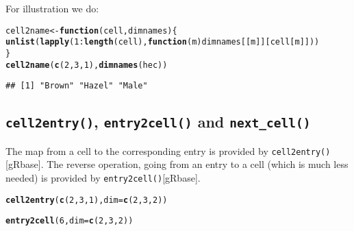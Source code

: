 \documentclass[10pt]{article}\usepackage[]{graphicx}\usepackage[]{xcolor}
\makeatletter
\newcommand{\hlnum}[1]{\textcolor[rgb]{0.686,0.059,0.569}{#1}}%
\newcommand{\hlopt}[1]{\textcolor[rgb]{0,0,0}{#1}}%
\newcommand{\hlstd}[1]{\textcolor[rgb]{0.345,0.345,0.345}{#1}}%
\newcommand{\hlkwa}[1]{\textcolor[rgb]{0.161,0.373,0.58}{\textbf{#1}}}%
\newcommand{\hlkwb}[1]{\textcolor[rgb]{0.69,0.353,0.396}{#1}}%
\newcommand{\hlkwc}[1]{\textcolor[rgb]{0.333,0.667,0.333}{#1}}%
\newcommand{\hlkwd}[1]{\textcolor[rgb]{0.737,0.353,0.396}{\textbf{#1}}}%
\newenvironment{kframe}{%
 \def\at@end@of@kframe{}%
 \ifinner\ifhmode%
  \def\at@end@of@kframe{\end{minipage}}%
  \begin{minipage}{\columnwidth}%
 \fi\fi%
 \def\FrameCommand##1{\hskip\@totalleftmargin \hskip-\fboxsep
 \colorbox{shadecolor}{##1}\hskip-\fboxsep
     \hskip-\linewidth \hskip-\@totalleftmargin \hskip\columnwidth}%
 \MakeFramed {\advance\hsize-\width
   \@totalleftmargin\z@ \linewidth\hsize
   \@setminipage}}%
 {\par\unskip\endMakeFramed%
 \at@end@of@kframe}
\newenvironment{knitrout}{}{} %
\def\code#1{\texttt{#1}}
\def\rr#1{\code{#1}[{\scriptsize gRbase}]}
\makeatother
\begin{document}
For illustration we do:
\begin{knitrout}\small
{}\color{fgcolor}\begin{kframe}
\begin{alltt}
\hlstd{cell2name} \hlkwb{<-} \hlkwa{function}\hlstd{(}\hlkwc{cell}\hlstd{,} \hlkwc{dimnames}\hlstd{)\{}
    \hlkwd{unlist}\hlstd{(}\hlkwd{lapply}\hlstd{(}\hlnum{1}\hlopt{:}\hlkwd{length}\hlstd{(cell),} \hlkwa{function}\hlstd{(}\hlkwc{m}\hlstd{) dimnames[[m]][cell[m]]))}
\hlstd{\}}
\hlkwd{cell2name}\hlstd{(}\hlkwd{c}\hlstd{(}\hlnum{2}\hlstd{,}\hlnum{3}\hlstd{,}\hlnum{1}\hlstd{),} \hlkwd{dimnames}\hlstd{(hec))}
\end{alltt}
\begin{verbatim}
## [1] "Brown" "Hazel" "Male"
\end{verbatim}
\end{kframe}
\end{knitrout}



\subsection{\code{cell2entry()}, \code{entry2cell()} and \code{next\_cell()} }


The map from a cell to the corresponding
entry is provided by \rr{cell2entry()}. The reverse operation, going
from an entry to a cell (which is much less needed) is provided by
\rr {entry2cell()}.

\begin{knitrout}\small
{}\color{fgcolor}\begin{kframe}
\begin{alltt}
\hlkwd{cell2entry}\hlstd{(}\hlkwd{c}\hlstd{(}\hlnum{2}\hlstd{,}\hlnum{3}\hlstd{,}\hlnum{1}\hlstd{),} \hlkwc{dim}\hlstd{=}\hlkwd{c}\hlstd{(}\hlnum{2}\hlstd{,} \hlnum{3}\hlstd{,} \hlnum{2}\hlstd{))}
\end{alltt}


{\ttfamily\noindent\bfseries{}}\begin{alltt}
\hlkwd{entry2cell}\hlstd{(}\hlnum{6}\hlstd{,} \hlkwc{dim}\hlstd{=}\hlkwd{c}\hlstd{(}\hlnum{2}\hlstd{,} \hlnum{3}\hlstd{,} \hlnum{2}\hlstd{))}
\end{alltt}


{\ttfamily\noindent\bfseries{}}\end{kframe}
\end{knitrout}
\end{document}
